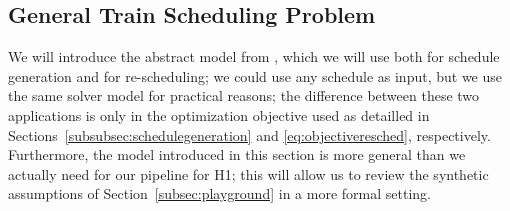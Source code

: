 \documentclass{article}
\begin{document}
\subsection{General Train Scheduling Problem}\label{subsubsec:scheduleproblemdescription}



We will introduce the abstract model from \cite{DBLP:journals/corr/abs-2003-08598}, which we will use both for schedule generation and for re-scheduling; we could use any schedule as input, but we use the same solver model for practical reasons; the difference between these two applications is only in the optimization objective used as detailled in Sections~\ref{subsubsec:schedulegeneration} and \ref{eq:objectiveresched}, respectively.
Furthermore, the model introduced in this section is more general than we actually need for our pipeline for H1; this will allow us to review the synthetic assumptions of Section~\ref{subsec:playground} in a more formal setting.
\end{document}

